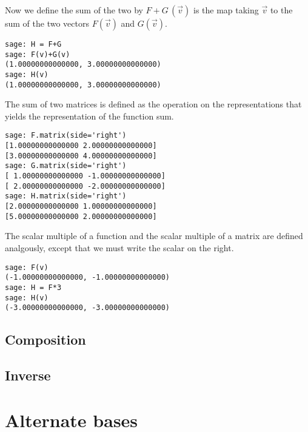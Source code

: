 Now we define the sum of the two by $F+G\,(\vec{v})$ is the map taking
$\vec{v}$ to the sum of the two vectors $F(\vec{v})$ and $G(\vec{v})$.
\begin{lstlisting}
sage: H = F+G
sage: F(v)+G(v)
(1.00000000000000, 3.00000000000000)
sage: H(v)
(1.00000000000000, 3.00000000000000)  
\end{lstlisting}

The sum of two matrices is defined as the operation on the representations
that yields the representation of the function sum.
\begin{lstlisting}
sage: F.matrix(side='right')
[1.00000000000000 2.00000000000000]
[3.00000000000000 4.00000000000000]
sage: G.matrix(side='right')
[ 1.00000000000000 -1.00000000000000]
[ 2.00000000000000 -2.00000000000000]
sage: H.matrix(side='right')
[2.00000000000000 1.00000000000000]
[5.00000000000000 2.00000000000000]  
\end{lstlisting}

The scalar multiple of a function and the scalar multiple of a matrix are
defined analgously, except that we must write the scalar on the right.
\begin{lstlisting}
sage: F(v)
(-1.00000000000000, -1.00000000000000)
sage: H = F*3
sage: H(v)
(-3.00000000000000, -3.00000000000000)  
\end{lstlisting}





\subsection{Composition}

\subsection{Inverse}








\section{Alternate bases}






\endinput


TODO:
